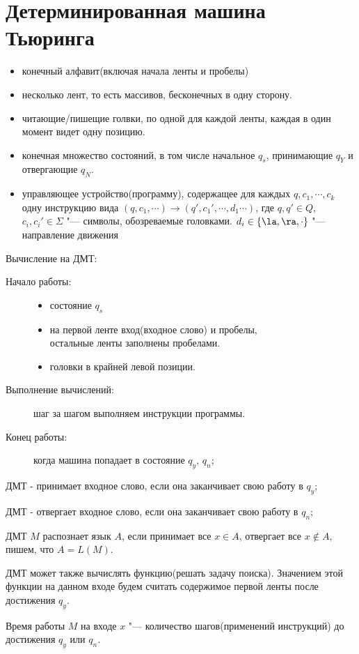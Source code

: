 \section{Детерминированная машина Тьюринга}
\begin{itemize}
\item конечный алфавит(включая начала ленты и пробелы)
\item несколько лент, то есть массивов, бесконечных в одну сторону. 
\item читающие/пишещие голвки, по одной для каждой ленты, 
каждая в один момент видет одну позицию. 
\item конечная множество состояний, в том числе начальное $q_s$, принимающие
$q_Y$ и отвергающие $q_N$.
\item управляющее устройство(программу), содержащее для каждых
$q, c_1, \cdots, c_k$ одну инструкцию вида $(q, c_1, \cdots) \to (q', c_1', \cdots, d_1 \cdots)$, 
где $q, q' \in Q$, $c_i, c_i' \in \Sigma$ "--- символы, обозреваемые 
головками. 
$d_i \in \{ \la, \ra, \cdot\}$ "--- направление движения

\begin{center}
\end{center}
\end{itemize}

Вычисление на ДМТ:
\begin{description}
\item[Начало работы:]
    \begin{itemize}
    \item состояние $q_s$
    \item на первой ленте вход(входное слово) и пробелы,\\
    остальные ленты заполнены пробелами.
    \item головки в крайней левой позиции.
    \end{itemize}
\item[Выполнение вычислений:]
шаг за шагом выполняем инструкции программы.
\item[Конец работы:] 
когда машина попадает в состояние $q_y$, $q_n$;
\end{description}      
\begin{Def}
ДМТ - принимает входное слово, 
если она заканчивает свою работу в $q_y$;
\end{Def}
\begin{Def}
ДМТ - отвергает входное слово, 
если она заканчивает свою работу в $q_n$;
\end{Def}
\begin{Def}
ДМТ $M$ распознает язык $A$, если принимает все 
$x \in A$, отвергает все $x \not \in A$, пишем, 
что $A = L(M)$.
\end{Def}
\begin{Rem}
ДМТ может также вычислять функцию(решать задачу поиска).
Значением этой функции на данном входе будем считать содержимое 
первой ленты после достижения $q_y$.
\end{Rem}
\begin{Def}
Время работы $M$ на входе $x$ "--- 
количество шагов(применений инструкций) до 
достижения $q_y$ или $q_n$.
\end{Def}

